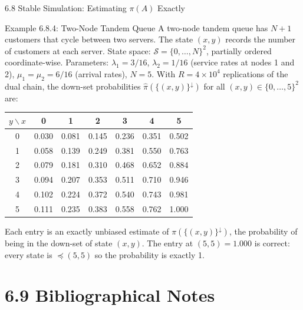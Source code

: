 \documentclass[aspectratio=169,10pt]{beamer}
\begin{document}
\begin{frame}[allowframebreaks]{6.8 Stable Simulation: Estimating $\pi(A)$ Exactly}
\begin{block}{Example 6.8.4: Two-Node Tandem Queue}
A two-node tandem queue has $N+1$ customers that cycle between two servers.
The state $(x,y)$ records the number of customers at each server.
State space: $\mathcal{S} = \{0,\ldots,N\}^2$, partially ordered coordinate-wise.
Parameters: $\lambda_1 = 3/16$, $\lambda_2 = 1/16$ (service rates at nodes 1 and 2), $\mu_1 = \mu_2 = 6/16$ (arrival rates), $N = 5$.
With $R = 4 \times 10^4$ replications of the dual chain, the down-set probabilities $\hat\pi(\{(x,y)\}^\downarrow)$ for all $(x,y) \in \{0,\ldots,5\}^2$ are:

\medskip
\begin{center}
\footnotesize
\begin{tabular}{c|cccccc}
  \toprule
  $y \backslash x$ & 0 & 1 & 2 & 3 & 4 & 5 \\
  \midrule
  0 & 0.030 & 0.081 & 0.145 & 0.236 & 0.351 & 0.502 \\
  1 & 0.058 & 0.139 & 0.249 & 0.381 & 0.550 & 0.763 \\
  2 & 0.079 & 0.181 & 0.310 & 0.468 & 0.652 & 0.884 \\
  3 & 0.094 & 0.207 & 0.353 & 0.511 & 0.710 & 0.946 \\
  4 & 0.102 & 0.224 & 0.372 & 0.540 & 0.743 & 0.981 \\
  5 & 0.111 & 0.235 & 0.383 & 0.558 & 0.762 & 1.000 \\
  \bottomrule
\end{tabular}
\end{center}
Each entry is an exactly unbiased estimate of $\pi(\{(x,y)\}^\downarrow)$, the probability of being in the down-set of state $(x,y)$.
The entry at $(5,5) = 1.000$ is correct: every state is $\preceq (5,5)$ so the probability is exactly 1.
\end{block}

\end{frame}

\section{6.9 Bibliographical Notes}
\end{document}
